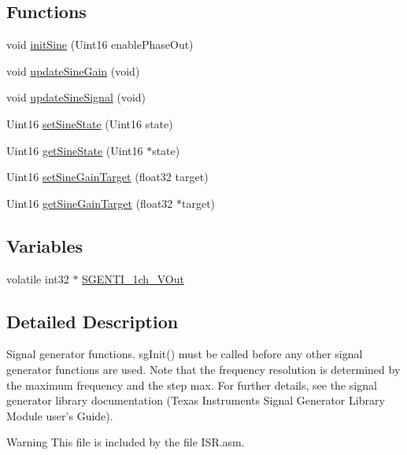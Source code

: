 \subsection*{Functions}
\begin{DoxyCompactItemize}
\item 
void \hyperlink{a00045_a4c050cf5f44fdac62f2260da4d5d6c32}{init\-Sine} (Uint16 enable\-Phase\-Out)
\item 
void \hyperlink{a00045_a5cd2ce3a0a44bf15cce989d0ec28483c}{update\-Sine\-Gain} (void)
\item 
void \hyperlink{a00045_a15cc3f7f606ea48016c591c798a55f15}{update\-Sine\-Signal} (void)
\item 
Uint16 \hyperlink{a00045_a70155ca3a5315917719d943e645e53d6}{set\-Sine\-State} (Uint16 state)
\item 
Uint16 \hyperlink{a00045_a63e4f7727c81ef635e50879433bc03b9}{get\-Sine\-State} (Uint16 $\ast$state)
\item 
Uint16 \hyperlink{a00045_ab40939821b2aba026ef55cf4ec9c12dd}{set\-Sine\-Gain\-Target} (float32 target)
\item 
Uint16 \hyperlink{a00045_a713b866aa5b5636f85d1a1f5f06b4ed3}{get\-Sine\-Gain\-Target} (float32 $\ast$target)
\end{DoxyCompactItemize}
\subsection*{Variables}
\begin{DoxyCompactItemize}
\item 
volatile int32 $\ast$ \hyperlink{a00045_a5dba1fe543c9e62ef6cc8cf4179de951}{S\-G\-E\-N\-T\-I\-\_\-1ch\-\_\-\-V\-Out}
\end{DoxyCompactItemize}


\subsection{Detailed Description}
Signal generator functions. sg\-Init() must be called before any other signal generator functions are used. Note that the frequency resolution is determined by the maximum frequency and the step max. For further details, see the signal generator library documentation (Texas Instruments Signal Generator Library Module user's Guide).

\begin{DoxyWarning}{Warning}
This file is included by the file I\-S\-R.\-asm. 
\end{DoxyWarning}


